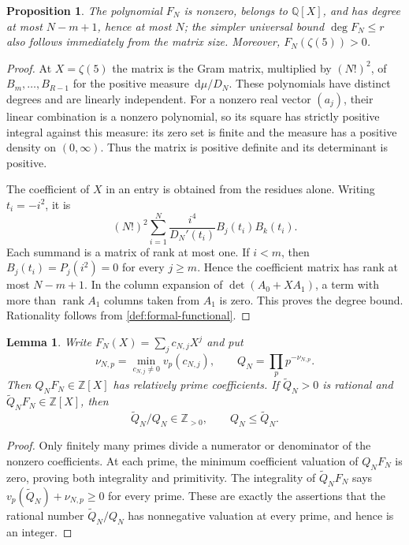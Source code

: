 \documentclass[11pt,letterpaper]{article}
\newtheorem{lemma}[lemma]{Lemma}
\newtheorem{proposition}[proposition]{Proposition}
\theoremstyle{definition}
\newcommand{\Q}{\mathbb Q}
\newcommand{\Z}{\mathbb Z}
\newcommand{\dd}{\,\mathrm d}
\DeclareMathOperator{\rank}{rank}
\begin{document}
\begin{proposition}\label{prop:gram-pencil}
The polynomial $F_N$ is nonzero, belongs to $\Q[X]$, and has degree at
most $N-m+1$, hence at most $N$; the simpler universal bound
$\deg F_N\le r$ also follows immediately from the matrix size. Moreover,
$F_N(\zeta(5))>0$.
\end{proposition}
\begin{proof}
At $X=\zeta(5)$ the matrix is the Gram matrix, multiplied by $(N!)^2$,
of $B_m,\ldots,B_{R-1}$ for the positive measure $\dd\mu/D_N$.
These polynomials have distinct degrees and are linearly independent.
For a nonzero real vector $(a_j)$, their linear combination is a
nonzero polynomial, so its square has strictly positive integral against
this measure: its zero set is finite and the measure has a positive
density on $(0,\infty)$. Thus the matrix is positive definite and its
determinant is positive.

The coefficient of $X$ in an entry is obtained from the residues alone.
Writing $t_i=-i^2$, it is
\[
 (N!)^2\sum_{i=1}^N
 \frac{i^4}{D_N'(t_i)}B_j(t_i)B_k(t_i).
\]
Each summand is a matrix of rank at most one. If $i<m$, then
$B_j(t_i)=P_j(i^2)=0$ for every $j\ge m$. Hence the coefficient matrix
has rank at most $N-m+1$. In the column expansion of
$\det(A_0+XA_1)$, a term with more than $\rank A_1$ columns taken
from $A_1$ is zero. This proves the degree bound. Rationality follows
from \cref{def:formal-functional}.
\end{proof}

\begin{lemma}\label{lem:primitive-normalizer}
Write $F_N(X)=\sum_j c_{N,j}X^j$ and put
\begin{equation}\label{eq:primitive-normalizer}
 \nu_{N,p}=\min_{c_{N,j}\ne0}v_p(c_{N,j}),\qquad
 Q_N=\prod_p p^{-\nu_{N,p}}.
\end{equation}
Then $Q_NF_N\in\Z[X]$ has relatively prime coefficients. If
$\widetilde Q_N>0$ is rational and
$\widetilde Q_NF_N\in\Z[X]$, then
\begin{equation}\label{eq:minimal-normalizer}
 \widetilde Q_N/Q_N\in\Z_{>0},\qquad Q_N\le\widetilde Q_N.
\end{equation}
\end{lemma}
\begin{proof}
Only finitely many primes divide a numerator or denominator of the
nonzero coefficients. At each prime, the minimum coefficient valuation
of $Q_NF_N$ is zero, proving both integrality and primitivity.
The integrality of $\widetilde Q_NF_N$ says
$v_p(\widetilde Q_N)+\nu_{N,p}\ge0$ for every prime. These are exactly
the assertions that the rational number $\widetilde Q_N/Q_N$ has
nonnegative valuation at every prime, and hence is an integer.
\end{proof}
\end{document}
